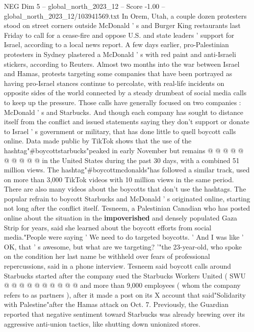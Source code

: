 \begin{textsample}{NEG Dim 5 – global\_north\_2023\_12 – Score -1.00 – global\_north\_2023\_12/103941569.txt}  \label{ex:f5_neg_116}
In Orem, Utah, a couple dozen protesters stood on street corners outside McDonald ' s and Burger King restaurants last Friday to call for a cease-fire and oppose U.S. and state leaders ' support for Israel, according to a local news report.
A few days earlier, pro-Palestinian protesters in Sydney plastered a McDonald ' s with red paint and anti-Israeli stickers, according to Reuters.
Almost two months into the war between Israel and Hamas, protests targeting some companies that have been portrayed as having pro-Israel stances continue to percolate, with real-life incidents on opposite sides of the world connected by a steady drumbeat of social media calls to keep up the pressure.
Those calls have generally focused on two companies : McDonald ' s and Starbucks.
And though each company has sought to distance itself from the conflict and issued statements saying they don't support or donate to Israel ' s government or military, that has done little to quell boycott calls online.
Data made public by TikTok shows that the use of the hashtag"\#boycottstarbucks"peaked in early November but remains @ @ @ @ @ @ @ @ @ @ in the United States during the past 30 days, with a combined 51 million views.
The hashtag"\#boycottmcdonalds"has followed a similar track, used on more than 3,000 TikTok videos with 10 million views in the same period.
There are also many videos about the boycotts that don't use the hashtags.
The popular refrain to boycott Starbucks and McDonald ' s originated online, starting not long after the conflict itself.
Tesneem, a Palestinian Canadian who has posted online about the situation in the \textbf{impoverished} and densely populated Gaza Strip for years, said she learned about the boycott efforts from social media."People were saying ' We need to do targeted boycotts. ' And I was like ' OK, that ' s awesome, but what are we targeting? '"the 23-year-old, who spoke on the condition her last name be withheld over fears of professional repercussions, said in a phone interview.
Tesneem said boycott calls around Starbucks started after the company sued the Starbucks Workers United ( SWU @ @ @ @ @ @ @ @ @ @ and more than 9,000 employees ( whom the company refers to as partners ), after it made a post on its X account that said"Solidarity with Palestine"after the Hamas attack on Oct. 7.
Previously, the Guardian reported that negative sentiment toward Starbucks was already brewing over its aggressive anti-union tactics, like shutting down unionized stores.

\end{textsample}

